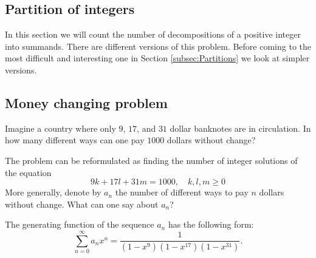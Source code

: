 \begin{page}

\section{Partition of integers}
In this section we will count the number of decompositions of a positive integer into summands.
There are different versions of this problem.
Before coming to the most difficult and interesting one in Section \ref{subsec:Partitions} we look at simpler versions.



\subsection{Money changing problem}
Imagine a country where only $9$, $17$, and $31$ dollar banknotes are in circulation.
In how many different ways can one pay $1000$ dollars without change?

The problem can be reformulated as finding the number of integer solutions of the equation
\[
9k + 17l + 31m = 1000, \quad k, l, m \ge 0
\]
More generally, denote by $a_n$ the number of different ways to pay $n$ dollars without change.
What can one say about $a_n$?


\end{page}

\begin{page}

\begin{thm}
\label{thm:Dollars}
The generating function of the sequence $a_n$ has the following form:
\[
\sum_{n=0}^\infty a_n x^n = \frac{1}{(1-x^9)(1-x^{17})(1-x^{31})}.
\]
\end{thm}

\end{page}

